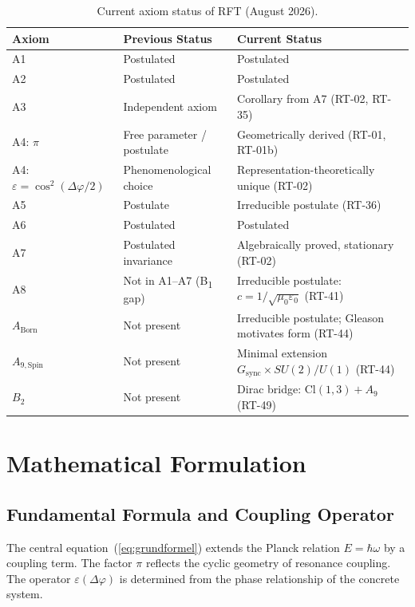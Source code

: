 \documentclass[12pt]{iopart}
\begin{document}
	\begin{table}[ht]
		\centering
		\caption{Current axiom status of RFT (August 2026).}
		\label{tab:axiom_status}
		\begin{tabular}{lll}
			\hline
			\textbf{Axiom} & \textbf{Previous Status}
			& \textbf{Current Status} \\
			\hline
			A1 & Postulated & Postulated \\
			A2 & Postulated & Postulated \\
			A3 & Independent axiom
			& Corollary from A7 (RT-02, RT-35) \\
			A4: $\pi$ & Free parameter / postulate
			& Geometrically derived (RT-01, RT-01b) \\
			A4: $\varepsilon{=}\cos^2(\Delta\varphi/2)$ & Phenomenological choice
			& Representation-theoretically unique (RT-02) \\
			A5 & Postulate
			& Irreducible postulate (RT-36) \\
			A6 & Postulated & Postulated \\
			A7 & Postulated invariance
			& Algebraically proved, stationary (RT-02) \\
			A8 & Not in A1--A7 (B\textsubscript{1} gap)
			& Irreducible postulate: $c=1/\sqrt{\mu_0\varepsilon_0}$ (RT-41) \\
			$A_{\mathrm{Born}}$ & Not present
			& Irreducible postulate; Gleason motivates form (RT-44) \\
			$A_{\mathrm{9,Spin}}$ & Not present
			& Minimal extension $G_{\mathrm{sync}}{\times}SU(2)/U(1)$ (RT-44) \\
			$B_2$ & Not present
			& Dirac bridge: $\mathrm{Cl}(1,3){+}A_9$ (RT-49) \\
			\hline
		\end{tabular}
	\end{table}
	
	
	\section{Mathematical Formulation}
	
	\subsection{Fundamental Formula and Coupling Operator}
	
	The central equation~(\ref{eq:grundformel}) extends the
	Planck relation $E = \hbar\omega$ by a coupling term.
	The factor $\pi$ reflects the cyclic geometry of
	resonance coupling. The operator
	$\varepsilon(\Delta\varphi)$ is determined from the phase
	relationship of the concrete system.
	
\end{document}
